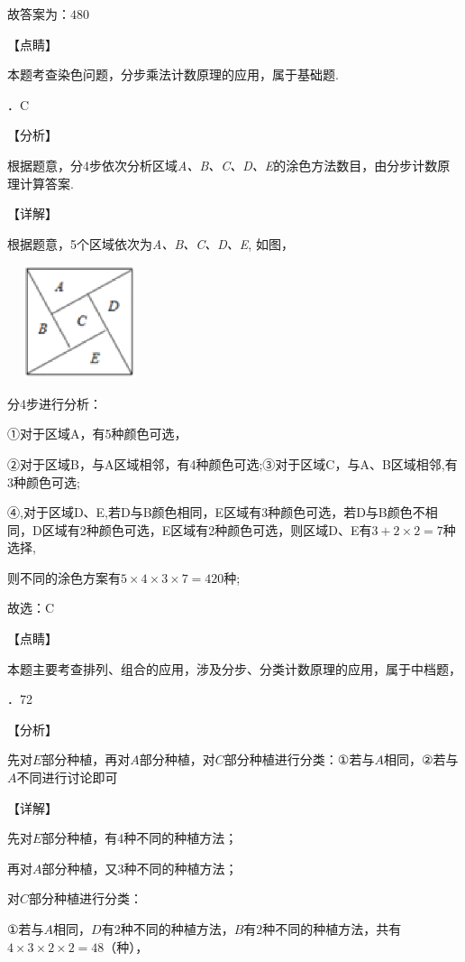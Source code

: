 \documentclass[a4paper,11pt,UTF8,twoside]{ctexart} %
\begin{document}
\noindent 故答案为：$480$

\noindent 【点睛】

\noindent 本题考查染色问题，分步乘法计数原理的应用，属于基础题.

．C

\noindent 【分析】

\noindent 根据题意，分4步依次分析区域\textit{A、B、C、D、E}的涂色方法数目，由分步计数原理计算答案.

\noindent 【详解】

\noindent 根据题意，5个区域依次为\textit{A、B、C、D、E}, 如图，

\noindent \includegraphics*[width=1.67in, height=1.30in, keepaspectratio=false]{image288}

\noindent 分4步进行分析：

\noindent ①对于区域A，有5种颜色可选，

\noindent ②对于区域B，与A区域相邻，有4种颜色可选;③对于区域C，与A、B区域相邻,有3种颜色可选;

\noindent ④,对于区域D、E,若D与B颜色相同，E区域有3种颜色可选，若D与B颜色不相同，D区域有2种颜色可选，E区域有2种颜色可选，则区域D、E有$3+2\times 2=7$种选择,

\noindent 则不同的涂色方案有$5\times 4\times 3\times 7=420$种;

\noindent 故选：C

\noindent 【点睛】

\noindent 本题主要考查排列、组合的应用，涉及分步、分类计数原理的应用，属于中档题，

．72

\noindent 【分析】

\noindent 先对$E$部分种植，再对$A$部分种植，对$C$部分种植进行分类：$\mathrm{\textrm{①}}$若与$A$相同，$\mathrm{\textrm{②}}$若与$A$不同进行讨论即可

\noindent 【详解】

\noindent 先对$E$部分种植，有4种不同的种植方法；

\noindent 再对$A$部分种植，又3种不同的种植方法；

\noindent 对$C$部分种植进行分类：

\noindent $\mathrm{\textrm{①}}$若与$A$相同，$D$有2种不同的种植方法，$B$有2种不同的种植方法，共有$4\times 3\times 2\times 2=48$（种），
\end{document}
